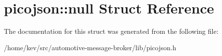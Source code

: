 \hypertarget{structpicojson_1_1null}{\section{picojson\+:\+:null Struct Reference}
\label{structpicojson_1_1null}
}


The documentation for this struct was generated from the following file\+:\begin{DoxyCompactItemize}
\item 
/home/kev/src/automotive-\/message-\/broker/lib/picojson.\+h\end{DoxyCompactItemize}
